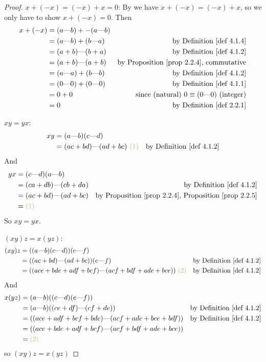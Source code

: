 \begin{proof}
 \(x + (-x) = (-x) + x = 0\):
By  we have \(x + (-x) = (-x) + x\), so we only have to show \(x + (-x) = 0\).
Then
\begin{align*}
    x + (-x) & = (a \M b) + -(a \M b) \\
             & = (a \M b) + (b \M a) & \text{by \DEF{4.1.4}} \\
             & = (a + b) \M (b + a) & \text{by \DEF{4.1.2}} \\
             & = (a + b) \M (a + b) & \text{by \PROP{2.2.4}, commutative} \\
             & = (a \M a) + (b \M b) & \text{by \DEF{4.1.2}} \\
             & = (0 \M 0) + (0 \M 0) & \text{by \DEF{4.1.1}} \\
             & = 0 + 0 & \text{since (natural) \(0 \equiv (0 \M 0)\) (integer)} \\
             & = 0 & \text{by \DEF{2.2.1}}
\end{align*}

 \(xy = yx\):
\begin{align*}
    xy & = (a \M b)(c \M d) \\
       & = (ac + bd) \M (ad + bc) \text{\ \GREEN{(1)}} & \text{by \DEF{4.1.2}}
\end{align*}
And 
\begin{align*}
    yx & = (c \M d)(a \M b) \\
       & = (ca + db) \M (cb + da) & \text{by \DEF{4.1.2}} \\
       & = (ac + bd) \M (ad + bc) & \text{by \PROP{2.2.4}, \PROP{2.2.5}} \\
       & = \text{\GREEN{(1)}}
\end{align*}
So \(xy = yx\).

 \((xy)z = x(yz)\):
\begin{align*}
    (xy)z & = ((a \M b)(c \M d))(e \M f) \\
          & = ((ac + bd) \M (ad + bc))(e \M f) & \text{by \DEF{4.1.2}} \\
          & = ((ace + bde + adf + bcf) \M (acf + bdf + ade + bce)) \text{\ \GREEN{(2)}} & \text{by \DEF{4.1.2}}
\end{align*}
And
\begin{align*}
    x(yz) & = (a \M b)((c \M d)(e \M f)) \\
          & = (a \M b)((ce + df) \M (cf + de)) & \text{by \DEF{4.1.2}} \\
          & = ((ace + adf + bcf + bde) \M (acf + ade + bce + bdf)) & \text{by \DEF{4.1.2}} \\
          & = ((ace + bde + adf + bcf) \M (acf + bdf + ade + bce)) \\
          & = \text{\GREEN{(2)}}
\end{align*}
so \((xy)z = x(yz)\)


\end{proof}
